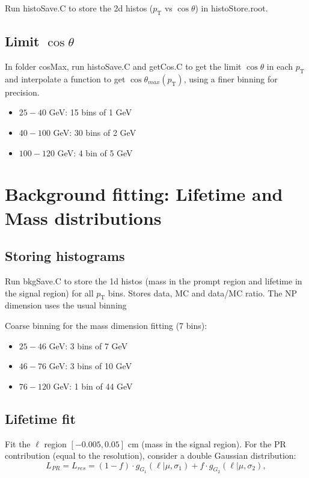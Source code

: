 \documentclass{article}
\newcommand{\pt}{p_\text{T}}
\newcommand{\cost}{\cos\theta}
\begin{document}
Run histoSave.C to store the 2d histos ($\pt$ vs $\cost$) in histoStore.root.

\subsection{Limit $\cost$}

In folder cosMax, run histoSave.C and getCos.C to get the limit $\cost$ in each $\pt$ and interpolate a function to get $\cost_{max}(\pt)$, using a finer binning for precision.
\begin{itemize}
\item $25-40$ GeV: 15 bins of 1 GeV
\item $40-100$ GeV: 30 bins of 2 GeV
\item $100-120$ GeV: 4 bin of 5 GeV
\end{itemize}

\pagebreak

\section{Background fitting: Lifetime and Mass distributions}

\subsection{Storing histograms}

Run bkgSave.C to store the 1d histos (mass in the prompt region and lifetime in the signal region) for all $\pt$ bins. Stores data, MC and data/MC ratio. The NP dimension uses the usual binning

Coarse binning for the mass dimension fitting (7 bins):
\begin{itemize}
\item $25-46$ GeV: 3 bins of 7 GeV
\item $46-76$ GeV: 3 bins of 10 GeV
\item $76-120$ GeV: 1 bin of 44 GeV
\end{itemize}

\subsection{Lifetime fit}

Fit the $\ell$ region $[-0.005,0.05]$ cm (mass in the signal region). For the PR contribution (equal to the resolution), consider a double Gaussian distribution:
\begin{equation}
L_{PR}=L_{res} = (1-f)\cdot g_{G_1}(\ell|\mu, \sigma_1)+f\cdot g_{G_2}(\ell|\mu, \sigma_2),
\end{equation}
\end{document}
